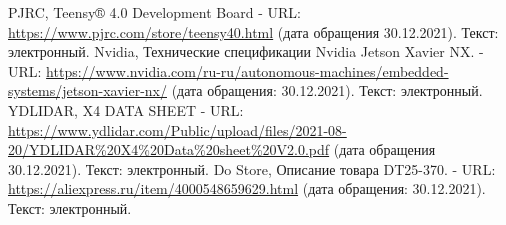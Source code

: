 \documentclass[12pt,a4paper]{scrartcl}
\begin{document}
\begin{thebibliography}{5}
		 PJRC, Teensy® 4.0 Development Board - URL: \url{https://www.pjrc.com/store/teensy40.html} (дата обращения 30.12.2021). Текст: электронный.
                 Nvidia, Технические спецификации Nvidia Jetson Xavier NX. - URL: \url{https://www.nvidia.com/ru-ru/autonomous-machines/embedded-systems/jetson-xavier-nx/} (дата обращения: 30.12.2021). Текст: электронный.
                 YDLIDAR, X4 DATA SHEET - URL: \url{https://www.ydlidar.com/Public/upload/files/2021-08-20/YDLIDAR%20X4%20Data%20sheet%20V2.0.pdf} (дата обращения 30.12.2021). Текст: электронный.
                 Do Store, Описание товара DT25-370. - URL: \url{https://aliexpress.ru/item/4000548659629.html} (дата обращения: 30.12.2021). Текст: электронный.
	\end{thebibliography}
	
\end{document}
